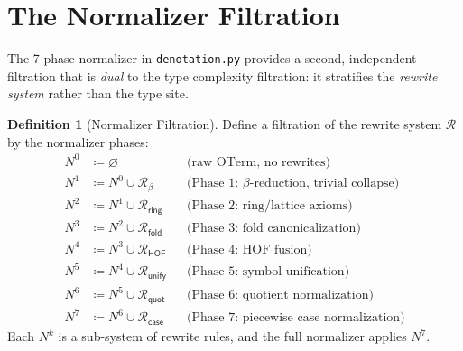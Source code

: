 \documentclass[11pt,a4paper]{report}
\theoremstyle{definition}
\newtheorem{definition}{Definition}[chapter]
\theoremstyle{plain}
\begin{document}
\section{The Normalizer Filtration}

The 7-phase normalizer in \texttt{denotation.py} provides a second,
independent filtration that is \emph{dual} to the type complexity
filtration: it stratifies the \emph{rewrite system} rather than the
type site.

\begin{definition}[Normalizer Filtration]
\label{def:normalizer-filtration}
Define a filtration of the rewrite system $\mathcal{R}$ by the
normalizer phases:
\begin{align}
  N^0 &\coloneqq \varnothing
    && \text{(raw OTerm, no rewrites)} \\
  N^1 &\coloneqq N^0 \cup \mathcal{R}_\beta
    && \text{(Phase 1: $\beta$-reduction, trivial collapse)} \\
  N^2 &\coloneqq N^1 \cup \mathcal{R}_\mathsf{ring}
    && \text{(Phase 2: ring/lattice axioms)} \\
  N^3 &\coloneqq N^2 \cup \mathcal{R}_\mathsf{fold}
    && \text{(Phase 3: fold canonicalization)} \\
  N^4 &\coloneqq N^3 \cup \mathcal{R}_\mathsf{HOF}
    && \text{(Phase 4: HOF fusion)} \\
  N^5 &\coloneqq N^4 \cup \mathcal{R}_\mathsf{unify}
    && \text{(Phase 5: symbol unification)} \\
  N^6 &\coloneqq N^5 \cup \mathcal{R}_\mathsf{quot}
    && \text{(Phase 6: quotient normalization)} \\
  N^7 &\coloneqq N^6 \cup \mathcal{R}_\mathsf{case}
    && \text{(Phase 7: piecewise case normalization)}
\end{align}
Each $N^k$ is a sub-system of rewrite rules, and the full normalizer
applies $N^7$.
\end{definition}
\end{document}
